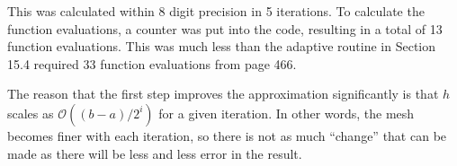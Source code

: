 \documentclass[12pt]{article}
\newcommand{\BigO}[1]{\mathcal{O}\left( #1 \right)}
\begin{document}
\begin{enumerate}
This was calculated within 8 digit precision in 5 iterations. To calculate the function evaluations, a counter was put into the code, resulting in a total of 13 function evaluations. This was much less than the adaptive routine in Section 15.4 required 33 function evaluations from page 466.

The reason that the first step improves the approximation significantly is that $h$ scales as $\BigO{(b-a)/2^{i}}$ for a given iteration. In other words, the mesh becomes finer with each iteration, so there is not as much ``change'' that can be made as there will be less and less error in the result.

\end{enumerate}

\end{document}
